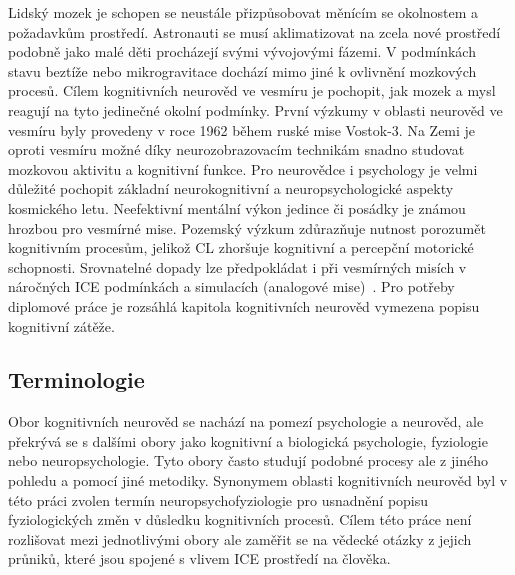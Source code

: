 Lidský mozek je schopen se neustále přizpůsobovat měnícím se okolnostem a
požadavkům prostředí. Astronauti se musí aklimatizovat na zcela nové prostředí
podobně jako malé děti procházejí svými vývojovými fázemi. V podmínkách stavu
beztíže nebo mikrogravitace dochází mimo jiné k ovlivnění mozkových procesů.
Cílem kognitivních neurověd ve vesmíru je pochopit, jak mozek a mysl reagují na
tyto jedinečné okolní podmínky. První výzkumy v oblasti neurověd ve vesmíru byly
provedeny v roce 1962 během ruské mise Vostok-3. Na Zemi je oproti vesmíru možné
díky neurozobrazovacím technikám snadno studovat mozkovou aktivitu a kognitivní
funkce. Pro neurovědce i psychology je velmi důležité pochopit základní
neurokognitivní a neuropsychologické aspekty kosmického letu. Neefektivní
mentální výkon jedince či posádky je známou hrozbou pro vesmírné mise. Pozemský
výzkum zdůrazňuje nutnost porozumět kognitivním procesům, jelikož \gls{CL}
zhoršuje kognitivní a percepční motorické schopnosti. Srovnatelné dopady lze
předpokládat i při vesmírných misích v náročných \gls{ICE} podmínkách a
simulacích (analogové mise)~\cite{Torre2014}. Pro potřeby diplomové práce je
rozsáhlá kapitola kognitivních neurověd vymezena popisu kognitivní zátěže.

\subsection{Terminologie}
\label{subsection:terminologie_CL}
Obor kognitivních neurověd se nachází na pomezí psychologie a neurověd, ale
překrývá se s dalšími obory jako kognitivní a biologická psychologie, fyziologie
nebo neuropsychologie. Tyto obory často studují podobné procesy ale z jiného
pohledu a pomocí jiné metodiky. Synonymem oblasti kognitivních neurověd byl v
této práci zvolen termín neuropsychofyziologie pro usnadnění popisu
fyziologických změn v důsledku kognitivních procesů. Cílem této práce není
rozlišovat mezi jednotlivými obory ale zaměřit se na vědecké otázky z jejich
průniků, které jsou spojené s vlivem \gls{ICE} prostředí na člověka.

